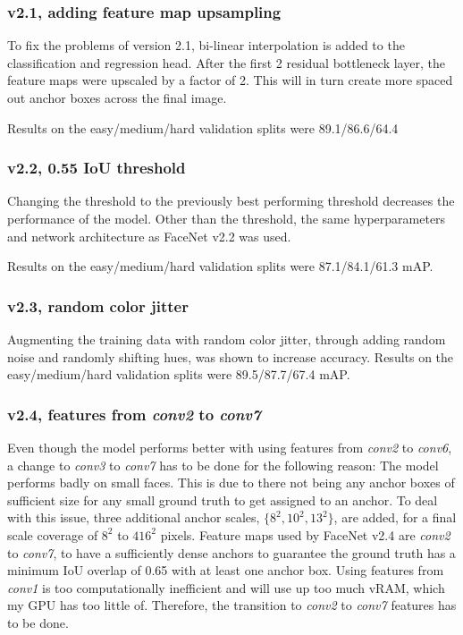 \documentclass[a4paper, twoside]{article}
\begin{document}
\subsubsection{v2.1, adding feature map upsampling}
To fix the problems of version 2.1, bi-linear interpolation is added to the classification and regression head. After the first 2 residual bottleneck layer, the feature maps were upscaled by a factor of 2. This will in turn create more spaced out anchor boxes across the final image.

Results on the easy/medium/hard validation splits were 89.1/86.6/64.4

\subsubsection{v2.2, 0.55 IoU threshold}
Changing the threshold to the previously best performing threshold decreases the performance of the model. Other than the threshold, the same hyperparameters and network architecture as FaceNet v2.2 was used.

Results on the easy/medium/hard validation splits were 87.1/84.1/61.3 mAP.

\subsubsection{v2.3, random color jitter}
Augmenting the training data with random color jitter, through adding random noise and randomly shifting hues, was shown to increase accuracy. Results on the easy/medium/hard validation splits were 89.5/87.7/67.4 mAP.

\subsubsection{v2.4, features from \textit{conv2} to \textit{conv7}}
Even though the model performs better with using features from \textit{conv2} to \textit{conv6}, a change to \textit{conv3} to \textit{conv7} has to be done for the following reason: The model performs badly on small faces. This is due to there not being any anchor boxes of sufficient size for any small ground truth to get assigned to an anchor. To deal with this issue, three additional anchor scales, $\{8^2, 10^2, 13^2\}$, are added, for a final scale coverage of $8^2$ to $416^2$ pixels. Feature maps used by FaceNet v2.4 are \textit{conv2} to \textit{conv7}, to have a sufficiently dense anchors to guarantee the ground truth has a minimum IoU overlap of 0.65 with at least one anchor box. Using features from \textit{conv1} is too computationally inefficient and will use up too much vRAM, which my GPU has too little of. Therefore, the transition to \textit{conv2} to \textit{conv7} features has to be done.
\end{document}
